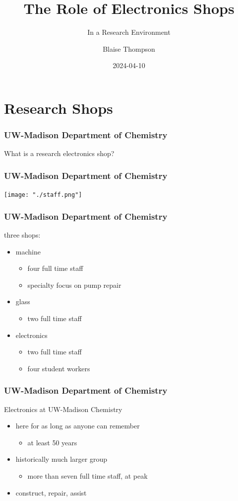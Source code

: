 \documentclass{presentation}
\title{The Role of Electronics Shops}
\subtitle{In a Research Environment}
\author{Blaise Thompson}
\institute{University of Wisconsin--Madison}
\date{2024-04-10}
\begin{document}
\maketitle

\section{Research Shops}

\begin{frame}\frametitle{UW-Madison Department of Chemistry}
  \huge
  What is a research electronics shop?
\end{frame}

\begin{frame}\frametitle{UW-Madison Department of Chemistry}
  \texttt{[image: "./staff.png"]}
\end{frame}

\begin{frame}\frametitle{UW-Madison Department of Chemistry}
  three shops:
  \begin{itemize}
    \item machine
      \begin{itemize}
        \item four full time staff
        \item specialty focus on pump repair
      \end{itemize}
    \item glass
      \begin{itemize}
        \item two full time staff
      \end{itemize}
    \item electronics
      \begin{itemize}
        \item two full time staff
        \item four student workers
      \end{itemize}
  \end{itemize}
\end{frame}

\begin{frame}\frametitle{UW-Madison Department of Chemistry}
  Electronics at UW-Madison Chemistry
  \begin{itemize}
    \item here for as long as anyone can remember
      \begin{itemize}
        \item at least 50 years
      \end{itemize}
    \item historically much larger group
      \begin{itemize}
        \item more than seven full time staff, at peak
      \end{itemize}
    \item construct, repair, assist
  \end{itemize}
\end{frame}
\end{document}
